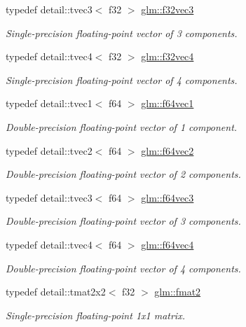 \begin{DoxyCompactItemize}
typedef detail\-::tvec3$<$ f32 $>$ \hyperlink{group__gtc__type__precision_ga6bb80987350b58f1869fd877bf70d316}{glm\-::f32vec3}
\begin{DoxyCompactList}\small\item\em Single-\/precision floating-\/point vector of 3 components. \end{DoxyCompactList}\item 
typedef detail\-::tvec4$<$ f32 $>$ \hyperlink{group__gtc__type__precision_ga87b80bb1fb0fba6433912ab9aec05f2c}{glm\-::f32vec4}
\begin{DoxyCompactList}\small\item\em Single-\/precision floating-\/point vector of 4 components. \end{DoxyCompactList}\item 
typedef detail\-::tvec1$<$ f64 $>$ \hyperlink{group__gtc__type__precision_ga9dabdd8a91258b035759121fa7880cb6}{glm\-::f64vec1}
\begin{DoxyCompactList}\small\item\em Double-\/precision floating-\/point vector of 1 component. \end{DoxyCompactList}\item 
typedef detail\-::tvec2$<$ f64 $>$ \hyperlink{group__gtc__type__precision_gabffd600c237af59b1686fce1ef461a84}{glm\-::f64vec2}
\begin{DoxyCompactList}\small\item\em Double-\/precision floating-\/point vector of 2 components. \end{DoxyCompactList}\item 
typedef detail\-::tvec3$<$ f64 $>$ \hyperlink{group__gtc__type__precision_ga31fd7a60d11d5ce44f3fad7418c93ec5}{glm\-::f64vec3}
\begin{DoxyCompactList}\small\item\em Double-\/precision floating-\/point vector of 3 components. \end{DoxyCompactList}\item 
typedef detail\-::tvec4$<$ f64 $>$ \hyperlink{group__gtc__type__precision_ga5032a5abd2c2a1f18927c9eeef088c7b}{glm\-::f64vec4}
\begin{DoxyCompactList}\small\item\em Double-\/precision floating-\/point vector of 4 components. \end{DoxyCompactList}\item 
typedef detail\-::tmat2x2$<$ f32 $>$ \hyperlink{group__gtc__type__precision_ga3b3dcea3b5987db4744388ad0acf22a5}{glm\-::fmat2}
\begin{DoxyCompactList}\small\item\em Single-\/precision floating-\/point 1x1 matrix. \end{DoxyCompactList}\item 

\end{DoxyCompactItemize}
